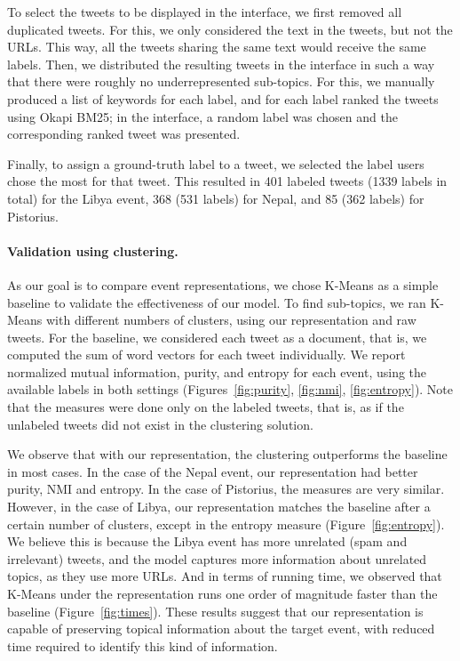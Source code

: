 To select the tweets to be displayed in the interface, we first removed all
duplicated tweets.
%
For this, we only considered the text in the tweets, but not the URLs.
%
This way, all the tweets sharing the same text would receive the same labels.
% 
Then, we distributed the resulting tweets in the interface in such a way that
there were roughly no underrepresented sub-topics.
%
For this, we manually produced a list of keywords for each label, and for each
label ranked the tweets using Okapi BM25;  in the interface, a random label was
chosen and the corresponding ranked tweet was presented.


Finally, to assign a ground-truth label to a tweet, we selected the label users
chose the most for that tweet.
%
This resulted in 401 labeled tweets (1339 labels in total) for the Libya event,
368 (531 labels) for Nepal, and 85 (362 labels) for Pistorius.


\paragraph{Validation using clustering.}
%
As our goal is to compare event representations, we chose K-Means as a simple
baseline to validate the effectiveness of our model.
%
To find sub-topics, we ran K-Means with different numbers of clusters, using our
representation and raw tweets.
%
For the baseline, we considered each tweet as a document, that is, we computed
the sum of word vectors for each tweet individually.
%
We report normalized mutual information, purity, and entropy for each event,
using the available labels in both settings (Figures~\ref{fig:purity},
\ref{fig:nmi}, \ref{fig:entropy}).
%
Note that the measures were done only on the labeled tweets, that is, as if the
unlabeled tweets did not exist in the clustering solution.


We observe that with our representation, the clustering outperforms the baseline
in most cases. 
%
In the case of the Nepal event, our representation had better purity, NMI and
entropy. 
%
In the case of Pistorius, the measures are very similar. 
%
However, in the case of Libya, our representation matches the baseline after a
certain number of clusters, except in the entropy measure
(Figure~\ref{fig:entropy}).
%
We believe this is because the Libya event has more unrelated (spam and
irrelevant) tweets, and the model captures more information about unrelated
topics, as they use more URLs.
%
And in terms of running time, we observed that K-Means under the representation
runs one order of magnitude faster than the baseline (Figure~\ref{fig:times}). 
%
These results suggest that our representation is capable of preserving topical
information about the target event, with reduced time required to identify this
kind of information. 
%

